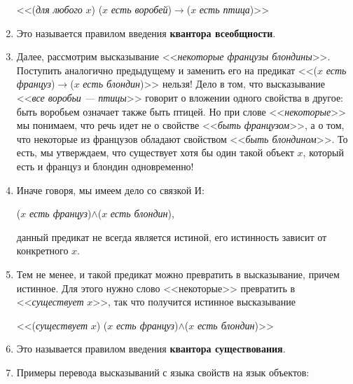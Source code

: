 \begin{enumerate}
\begin{center}
<<(\textit{для любого} $x$) ($x$ \textit{есть воробей})$\to$($x$ \textit{есть птица})>>
\end{center}
\item Это называется правилом введения \textbf{квантора всеобщности}.
\item Далее, рассмотрим высказывание <<\textit{некоторые французы блондины}>>. Поступить аналогично предыдущему и заменить его на  предикат <<($x$ \textit{есть француз})$\to$($x$ \textit{есть блондин})>> нельзя! Дело в том, что высказывание <<\textit{все воробьи --- птицы}>> говорит о вложении одного свойства в другое: быть воробьем означает также быть птицей. Но при слове <<\textit{некоторые}>> мы понимаем, что речь идет не о свойстве <<\textit{быть французом}>>, а о том, что некоторые из французов обладают свойством <<\textit{быть блондином}>>. То есть, мы утверждаем, что существует хотя бы один такой объект $x$, который есть и француз и блондин одновременно!
\item Иначе говоря, мы имеем дело со связкой И:
\begin{center}
($x$ \textit{есть француз})$\land$($x$ \textit{есть блондин}),
\end{center}
данный предикат не всегда является истиной, его истинность зависит от конкретного $x$.
\item Тем не менее, и такой предикат можно превратить в высказывание, причем истинное. Для этого нужно слово <<некоторые>> превратить в <<\textit{существует} $x$>>, так что получится истинное высказывание
\begin{center}
<<(\textit{существует} $x$) ($x$ \textit{есть француз})$\land$($x$ \textit{есть блондин})>>
\end{center}
\item Это называется правилом введения \textbf{квантора существования}.
\item Примеры перевода высказываний с языка свойств на язык объектов:\hfill\;


\end{enumerate}
